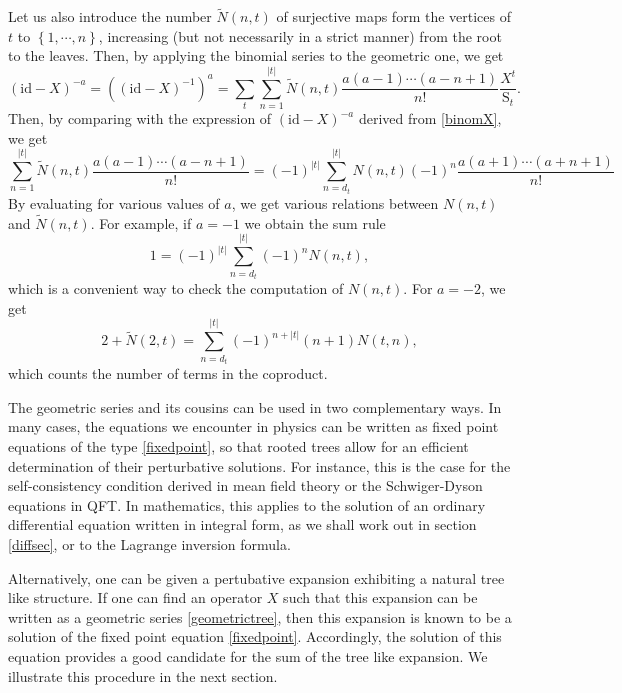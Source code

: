 \documentclass[10pt,here,feynmf]{article}
\begin{document}
Let us also introduce   the number $\widetilde{N}(n,t)$ of surjective maps form the vertices of $t$ to $\left\{1,\cdots,n\right\}$, increasing (but not necessarily in a strict manner) from the root to the leaves.
Then, by applying the binomial series to the geometric one, we get
\begin{equation}
(\mathrm{id}-X)^{-a}=\left((\mathrm{id}-X)^{-1}\right)^{a}=\sum_{t}
\sum_{n=1}^{|t|}\widetilde{N}(n,t)\frac{a(a-1)\cdots (a-n+1)}{n!}
\frac{X^{t}}{\mathrm{S}_{t}}.
\end{equation}
Then, by comparing with the expression of $(\mathrm{id}-X)^{-a}$ derived from \eqref{binomX}, we get
\begin{equation}
\sum_{n=1}^{|t|}\widetilde{N}(n,t)\frac{a(a-1)\cdots (a-n+1)}{n!}
=(-1)^{|t|}\sum_{n=d_{t}}^{|t|}N(n,t)(-1)^{n}\frac{a(a+1)\cdots (a+n+1)}{n!}
\end{equation}
By evaluating for various values of $a$, we get various relations between $N(n,t)$ and $\tilde{N}(n,t)$. For example, if $a=-1$ we obtain the sum rule
\begin{equation}
1=(-1)^{|t|}\sum_{n=d_{t}}^{|t|}(-1)^{n}N(n,t),
\end{equation}
which is a convenient way to check the computation of $N(n,t)$. For $a=-2$, we get
\begin{equation}
2+\widetilde{N}(2,t)=\sum_{n=d_{t}}^{|t|}(-1)^{n+|t|}(n+1)N(t,n),
\end{equation}  
which counts  the number of terms in the coproduct.


The geometric series and its cousins  can be used in two complementary ways. In many cases, the equations we encounter in physics can be written as fixed point equations of the type \eqref{fixedpoint}, so that rooted trees allow for an efficient determination of their perturbative solutions. For instance, this is the case for the self-consistency condition derived in mean field theory or the Schwiger-Dyson equations in QFT. In mathematics, this applies to the solution of an ordinary differential equation written in integral form, as we shall work out in section \ref{diffsec}, or to the Lagrange inversion formula.

Alternatively, one can be given a pertubative expansion exhibiting a natural tree like structure.  If one can find an operator $X$ such that this expansion can be written as a geometric series \eqref{geometrictree}, then this expansion is known to be a solution of the fixed point equation \eqref{fixedpoint}. Accordingly, the solution of this equation provides a good candidate for the sum of the tree like expansion.  We illustrate this procedure in the next section.
\end{document}
